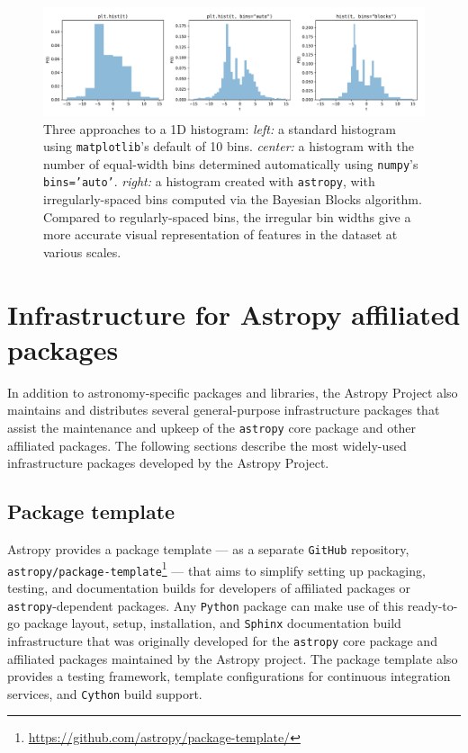 \documentclass[modern]{aastex61}
\newcommand{\package}[1]{\texttt{#1}\xspace}
\newcommand{\github}{\package{GitHub}}
\newcommand{\python}{\package{Python}}
\newcommand{\astropy}{Astropy\xspace}
\newcommand{\astropypkg}{\package{astropy}}
\begin{document}
\begin{figure}
\includegraphics[width=\textwidth]{bayesian_blocks_hist.pdf}
\caption{%
    Three approaches to a 1D histogram:
    {\it left:} a standard histogram using \package{matplotlib}'s default of 10 bins.
    {\it center:} a histogram with the number of equal-width bins determined automatically using \package{numpy}'s {\tt bins='auto'}.
    {\it right:} a histogram created with \astropypkg, with irregularly-spaced bins computed via the Bayesian Blocks algorithm.
    Compared to regularly-spaced bins, the irregular bin widths give a more accurate visual representation of features in the dataset at various scales.
    \label{fig:bayes-blocks-hist}
}
\end{figure}

\section{Infrastructure for Astropy affiliated packages}

\label{sec:infrastructure}

In addition to astronomy-specific packages and libraries, the \astropy Project
also maintains and distributes several general-purpose infrastructure packages
that assist the maintenance and upkeep of the \astropypkg core package and
other affiliated packages.
The following sections describe the most widely-used infrastructure packages
developed by the \astropy Project.

\subsection{Package template}

\astropy provides a package template --- as a separate \github repository,
\package{astropy/package-template}\footnote{\url{https://github.com/astropy/package-template/}}
--- that aims to simplify setting up packaging, testing, and
documentation builds for developers of affiliated packages or
\astropypkg-dependent packages.
Any \python package can make use of this ready-to-go package layout, setup,
installation, and \package{Sphinx} documentation build infrastructure that was
originally developed for the \astropypkg core package and affiliated packages
maintained by the \astropy project.
The package template also provides a testing framework, template configurations
for continuous integration services, and \package{Cython} build support.
\end{document}
